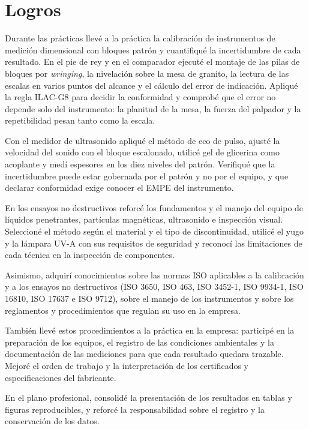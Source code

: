 \section{Logros}

Durante las prácticas llevé a la práctica la calibración de instrumentos de
medición dimensional con bloques patrón y cuantifiqué la incertidumbre de cada
resultado. En el pie de rey y en el comparador ejecuté el montaje de las pilas de
bloques por \textit{wringing}, la nivelación sobre la mesa de granito, la lectura de
las escalas en varios puntos del alcance y el cálculo del error de indicación.
Apliqué la regla ILAC-G8 para decidir la conformidad y comprobé que el error no
depende solo del instrumento: la planitud de la mesa, la fuerza del palpador y la
repetibilidad pesan tanto como la escala.

Con el medidor de ultrasonido apliqué el método de eco de pulso, ajusté la
velocidad del sonido con el bloque escalonado, utilicé gel de glicerina como
acoplante y medí espesores en los diez niveles del patrón. Verifiqué que la
incertidumbre puede estar gobernada por el patrón y no por el equipo, y que
declarar conformidad exige conocer el EMPE del instrumento.

En los ensayos no destructivos reforcé los fundamentos y el manejo del equipo de
líquidos penetrantes, partículas magnéticas, ultrasonido e inspección visual.
Seleccioné el método según el material y el tipo de discontinuidad, utilicé el yugo
y la lámpara UV-A con sus requisitos de seguridad y reconocí las limitaciones de
cada técnica en la inspección de componentes.

Asimismo, adquirí conocimientos sobre las normas ISO aplicables a la calibración y
a los ensayos no destructivos (ISO 3650, ISO 463, ISO 3452-1, ISO 9934-1,
ISO 16810, ISO 17637 e ISO 9712), sobre el manejo de los instrumentos y sobre los
reglamentos y procedimientos que regulan su uso en la empresa.

También llevé estos procedimientos a la práctica en la empresa: participé en la
preparación de los equipos, el registro de las condiciones ambientales y la
documentación de las mediciones para que cada resultado quedara trazable. Mejoré
el orden de trabajo y la interpretación de los certificados y especificaciones del
fabricante.

En el plano profesional, consolidé la presentación de los resultados en tablas y
figuras reproducibles, y reforcé la responsabilidad sobre el registro y la
conservación de los datos.
